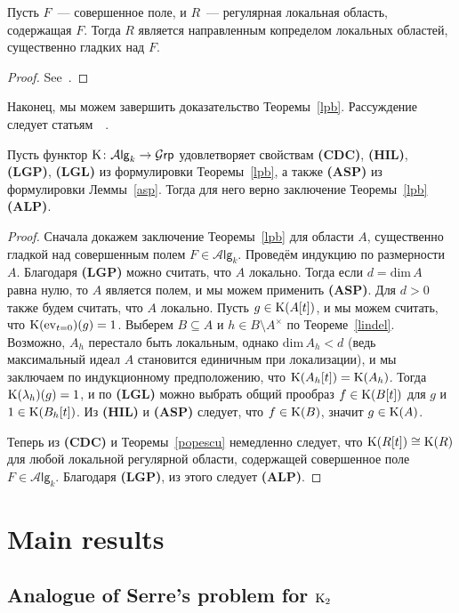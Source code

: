 \documentclass[oneside, 11pt]{amsart} \pdfoutput=1
\begin{document}
\begin{theorem}[Popescu]
\label{popescu}
Пусть $F$~--- совершенное поле, и $R$~--- регулярная локальная область, содержащая $F$. Тогда $R$ является направленным копределом локальных областей, существенно гладких над $F$.
\end{theorem}
\begin{proof} See~\cite{Po90,Sw98}. \end{proof}

Наконец, мы можем завершить доказательство Теоремы~\ref{lpb}. Рассуждение следует статьям~~\cite{Sta14, Vo81}.

\begin{lemma}
Пусть функтор ${\mathrm{K}}\colon\mathcal A\mathsf{lg}_k\rightarrow\mathcal G\mathsf{rp}$ удовлетворяет свойствам {\bf(CDC)}, {\bf(HIL)}, {\bf(LGP)}, {\bf(LGL)} из формулировки Теоремы~\ref{lpb}, а также {\bf(ASP)} из формулировки Леммы~\ref{asp}. Тогда для него верно заключение Теоремы~\ref{lpb} {\bf(ALP)}. 
\end{lemma}
\begin{proof}
Сначала докажем заключение Теоремы~\ref{lpb} для области $A$, существенно гладкой над совершенным полем $F\in\mathcal A\mathsf{lg}_k$. Проведём индукцию по размерности $A$. Благодаря {\bf(LGP)} можно считать, что $A$ локально. Тогда если $d=\mathrm{dim}\,A$ равна нулю, то $A$ является полем, и мы можем применить {\bf(ASP)}. Для $d>0$ также будем считать, что $A$ локально. Пусть $g\in{\mathrm{K}}(A[t])$, и мы можем считать, что ${\mathrm{K}}(\mathrm{ev}_{t=0})(g)=1$. Выберем $B\subseteq A$ и $h\in B\setminus A^\times$ по Теореме~\ref{lindel}. Возможно, $A_h$ перестало быть локальным, однако $\mathrm{dim}\,A_h<d$ (ведь максимальный идеал $A$ становится единичным при локализации), и мы заключаем по индукционному предположению, что ${\mathrm{K}}(A_h[t])={\mathrm{K}}(A_h)$. Тогда ${\mathrm{K}}(\lambda_h)(g)=1$, и по {\bf(LGL)} можно выбрать общий прообраз $f\in{\mathrm{K}}(B[t])$ для $g$ и $1\in{\mathrm{K}}(B_h[t])$. Из {\bf(HIL)} и {\bf(ASP)} следует, что $f\in{\mathrm{K}}(B)$, значит $g\in{\mathrm{K}}(A)$.

Теперь из {\bf(CDC)} и Теоремы~\ref{popescu} немедленно следует, что ${\mathrm{K}}(R[t])\cong{\mathrm{K}}(R)$ для любой локальной регулярной области, содержащей совершенное поле $F\in\mathcal A\mathsf{lg}_k$. Благодаря {\bf(LGP)}, из этого следует {\bf(ALP)}.
\end{proof}

\section{Main results}
\subsection{Analogue of Serre's problem for \texorpdfstring{${\mathrm{K}}_2$}{K2}}
\end{document}
